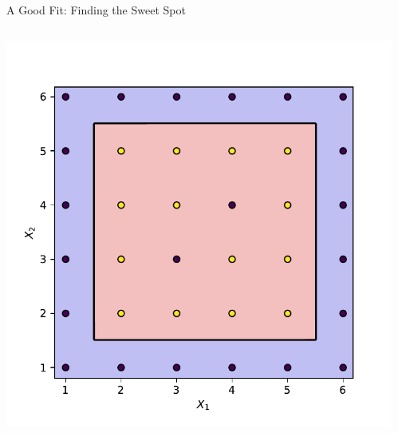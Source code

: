 \documentclass{beamer}
\begin{document}
	\begin{frame}{A Good Fit: Finding the Sweet Spot}
	\begin{columns}
		\begin{column}{0.5\textwidth}
			\includegraphics[width=\textwidth]{example-2-optimal-boundary}
		\end{column}
		\begin{column}{0.5\textwidth}

\end{column}
\end{columns}
\end{frame}
\end{document}
